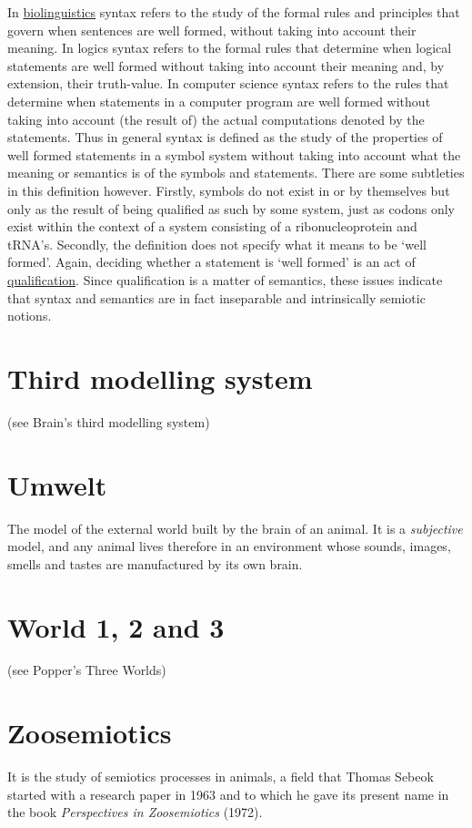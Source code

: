 \documentclass[12pt]{article}
\begin{document}
In \hyperlink{biolinguistics}{biolinguistics} syntax refers to the
study of the formal rules and principles that govern when sentences
are well formed, without taking into account their meaning. In logics
syntax refers to the formal rules that determine when logical
statements are well formed without taking into account their meaning
and, by extension, their truth-value.  In computer science syntax
refers to the rules that determine when statements in a computer
program are well formed without taking into account (the result of)
the actual computations denoted by the statements. Thus in general
syntax is defined as the study of the properties of well formed
statements in a symbol system without taking into account what the
meaning or semantics is of the symbols and statements.  There are some
subtleties in this definition however. Firstly, symbols do not exist
in or by themselves but only as the result of being qualified as such
by some system, just as codons only exist within the context of a
system consisting of a ribonucleoprotein and tRNA's. Secondly, the
definition does not specify what it means to be `well formed'. Again,
deciding whether a statement is `well formed' is an act of
\hyperlink{qualification}{qualification}. Since qualification is a
matter of semantics, these issues indicate that syntax and semantics
are in fact inseparable and intrinsically semiotic notions.

\section{Third modelling system} (see Brain's third modelling system)


\section{Umwelt}
The model of the external world built by the brain of an animal. It is a \textit{subjective} model, and any animal lives therefore in an environment whose sounds, images, smells and tastes are manufactured by its own brain.


\section{World 1, 2 and 3} (see Popper's Three Worlds)


\section{Zoosemiotics}
It is the study of semiotics processes in animals, a field that Thomas Sebeok started with a research paper in 1963 and to which he gave its present name in the book \textit{Perspectives in Zoosemiotics} (1972). 
 




\end{document}
